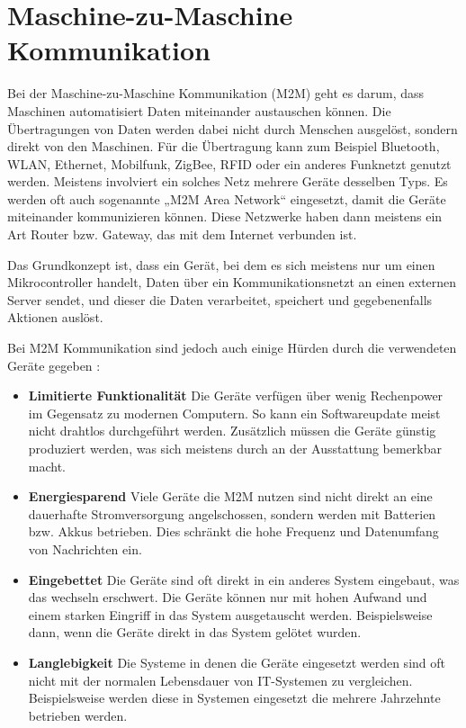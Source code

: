 \section{Maschine-zu-Maschine Kommunikation}
\label{sec:MachineZuMachineKommunikation}
Bei der Maschine-zu-Maschine Kommunikation (\ac{M2M}) geht es darum, dass Maschinen automatisiert Daten miteinander austauschen können. Die Übertragungen von Daten werden dabei nicht durch Menschen ausgelöst, sondern direkt von den Maschinen. Für die Übertragung kann zum Beispiel Bluetooth, WLAN, Ethernet, Mobilfunk, ZigBee, RFID oder ein anderes Funknetzt genutzt werden. Meistens involviert ein solches Netz mehrere Geräte desselben Typs. Es werden oft auch sogenannte „M2M Area Network“ eingesetzt, damit die Geräte miteinander kommunizieren können. Diese Netzwerke haben dann meistens ein Art Router bzw. Gateway, das mit dem Internet verbunden ist.  

Das Grundkonzept ist, dass ein Gerät, bei dem es sich meistens nur um einen Mikrocontroller handelt, Daten über ein Kommunikationsnetzt an einen externen Server sendet, und dieser die Daten verarbeitet, speichert und gegebenenfalls Aktionen auslöst.

Bei M2M Kommunikation sind jedoch auch einige Hürden durch die verwendeten Geräte gegeben \cite[S. 4f]{boswarthick2012m2m}: 
\begin{itemize}
\item \textbf{Limitierte  Funktionalität} Die Geräte verfügen über wenig Rechenpower im Gegensatz zu modernen Computern. So kann ein Softwareupdate meist nicht drahtlos durchgeführt werden. Zusätzlich müssen die Geräte günstig produziert werden, was sich meistens durch an der Ausstattung bemerkbar macht. 
\item \textbf{Energiesparend } Viele Geräte die M2M nutzen sind nicht direkt an eine dauerhafte Stromversorgung angelschossen, sondern werden mit Batterien bzw. Akkus betrieben. Dies schränkt die hohe Frequenz und Datenumfang von Nachrichten ein. 
\item \textbf{Eingebettet } Die Geräte sind oft direkt in ein anderes System eingebaut, was das wechseln erschwert. Die Geräte können nur mit hohen Aufwand und einem starken Eingriff in das System ausgetauscht werden. Beispielsweise dann,  wenn die Geräte direkt in das System gelötet wurden.
\item \textbf{Langlebigkeit } Die Systeme in denen die Geräte eingesetzt werden sind oft nicht mit der normalen Lebensdauer von IT-Systemen zu vergleichen. Beispielsweise werden diese in Systemen eingesetzt die mehrere Jahrzehnte betrieben werden. 
\end{itemize}

